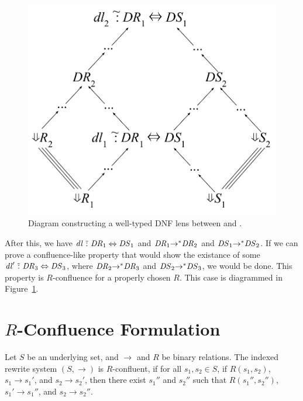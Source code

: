 \documentclass{easychair}
\begin{document}
\begin{figure}
  \centering
    \includegraphics[scale=.4]{equiv-case.pdf}
    \caption{Diagram constructing a well-typed DNF lens between
       and .}
    \label{fig:equiv-case}
\end{figure}

After this, we have $\mathit{dl} \,\,\tilde{:}\,\, \mathit{DR}_1 \Leftrightarrow
\mathit{DS}_1$ and $\mathit{DR}_1 {\rightarrow}^* \mathit{DR}_2$ and
$\mathit{DS}_1 {\rightarrow}^* \mathit{DS}_2$. If we can prove a
confluence-like property that would show the existance of some $\mathit{dl}'
\,\,\tilde{:}\,\, \mathit{DR}_3 \Leftrightarrow \mathit{DS}_3$, where
$\mathit{DR}_2 {\rightarrow}^* \mathit{DR}_3$ and $\mathit{DS}_2
{\rightarrow}^* \mathit{DS}_3$, we would be done. This property is
$R$-confluence for a properly chosen $R$. This case is diagrammed in
Figure~\ref{fig:equiv-case}.

\section{$R$-Confluence Formulation}
Let $S$ be an underlying set, and $\rightarrow$ and $R$ be binary relations. The
indexed rewrite system $(S,\rightarrow)$ is $R$-confluent, if for all $s_1,s_2 \in
S$, if $R(s_1,s_2)$, $s_1 \rightarrow s_1'$, and $s_2 \rightarrow s_2'$, then
there exist $s_1''$ and $s_2''$ such that $R(s_1'',s_2'')$, $s_1' \rightarrow
s_1''$, and $s_2 \rightarrow s_2''$.
\end{document}
